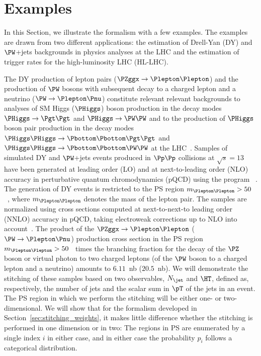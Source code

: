 \section{Examples}
\label{sec:examples}

In this Section, we illustrate the formalism with a few examples.
The examples are drawn from two different applications: the estimation of Drell-Yan (DY) and $\PW$+jets backgrounds in physics analyses at the LHC
and the estimation of trigger rates for the high-luminosity LHC (HL-LHC).

The DY production of lepton pairs ($\PZggx \to \Plepton\Plepton$) and the production of $\PW$ bosons with subsequent decay to a charged lepton and a neutrino ($\PW \to \Plepton\Pnu$)
constitute relevant relevant backgrounds to analyses of SM Higgs ($\PHiggs$) boson production in the decay modes $\PHiggs \to \Pgt\Pgt$ and $\PHiggs \to \PW\PW$
and to the production of $\PHiggs$ boson pair production in the decay modes $\PHiggs\PHiggs \to \Pbottom\Pbottom\Pgt\Pgt$ and $\PHiggs\PHiggs \to \Pbottom\Pbottom\PW\PW$ 
at the LHC~\cite{ATLAS:2014aga,Aad:2015vsa,Aad:2019yxi,Aaboud:2018sfw,CMS-HIG-13-004,CMS-HIG-13-027,CMS-HIG-17-002,CMS-HIG-17-006}.
Samples of simulated DY and $\PW$+jets events produced in $\Pp\Pp$ collisions at $\sqrt{s}=13$~\TeV
have been generated at leading order (LO) and at next-to-leading order (NLO) accuracy in perturbative quantum chromodynamics (pQCD)
using the program \MGvATNLO~\cite{Alwall:2014hca}.
The generation of DY events is restricted to the PS region $m_{\Plepton\Plepton} > 50$~\GeV, where $m_{\Plepton\Plepton}$ denotes the mass of the lepton pair.
The samples are normalized using cross sections computed at next-to-next-to leading order (NNLO) accuracy in pQCD,
taking electroweak corrections up to NLO into account~\cite{Li:2012wna}.
The product of the $\PZggx \to \Plepton\Plepton$ ($\PW \to \Plepton\Pnu$) production cross section in the PS region $m_{\Plepton\Plepton} > 50$~\GeV
times the branching fraction for the decay of the $\PZ$ boson or virtual photon to two charged leptons (of the $\PW$ boson to a charged lepton and a neutrino) amounts to $6.11$~nb ($20.5$~nb).
We will demonstrate the stitching of these samples based on two observables,
$N_{\jet}$ and $\HT$, defined as, respectively, the number of jets and the scalar sum in $\pT$ of the jets in an event.
The PS region in which we perform the stitching will be either one- or two-dimensional.
We will show that for the formalism developed in Section~\ref{sec:stitching_weights},
it makes little difference whether the stitching is performed in one dimension or in two:
The regions in PS are enumerated by a single index $i$ in either case,
and in either case the probability $p_{i}$ follows a categorical distribution.

